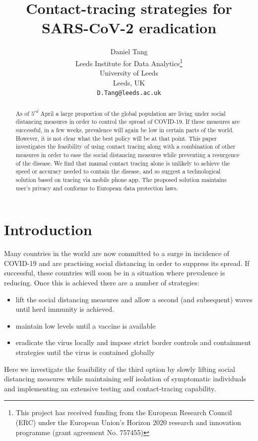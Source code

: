 \documentclass{article}
\title{Contact-tracing strategies for SARS-CoV-2 eradication
}
\author{
  Daniel Tang\\
  Leeds Institute for Data Analytics\thanks{This project has received funding from the European Research Council (ERC) under the European Union’s Horizon 2020 research and innovation programme (grant agreement No. 757455)}\\
  University of Leeds\\
  Leeds, UK\\
  \texttt{D.Tang@leeds.ac.uk} \\
}
\begin{document}
\maketitle

\begin{abstract}
As of $5^{rd}$ April a large proportion of the global population are living under social distancing measures in order to control the spread of COVID-19. If these measures are successful, in a few weeks, prevalence will again be low in certain parts of the world. However, it is not clear what the best policy will be at that point. This paper investigates the feasibility of using contact tracing along with a combination of other measures in order to ease the social distancing measures while preventing a resurgence of the disease. We find that manual contact tracing alone is unlikely to achieve the speed or accuracy needed to contain the disease, and so suggest a technological solution based on tracing via mobile phone app. The proposed solution maintains user's privacy and conforms to European data protection laws.
\end{abstract}


\section{Introduction}

Many countries in the world are now committed to a surge in incidence of COVID-19 and are practising social distancing in order to suppress its spread. If successful, these countries will soon be in a situation where prevalence is reducing. Once this is achieved there are a number of strategies:
\begin{itemize}

\item lift the social distancing measures and allow a second (and subsequent) waves until herd immunity is achieved\cite{ferguson2020impact}.

\item maintain low levels until a vaccine is available

\item eradicate the virus locally and impose strict border controls and containment strategies until the virus is contained globally
\end{itemize}

Here we investigate the feasibility of the third option by slowly lifting social distancing measures while maintaining self isolation of symptomatic individuals and implementing an extensive testing and contact-tracing capability.
\end{document}
